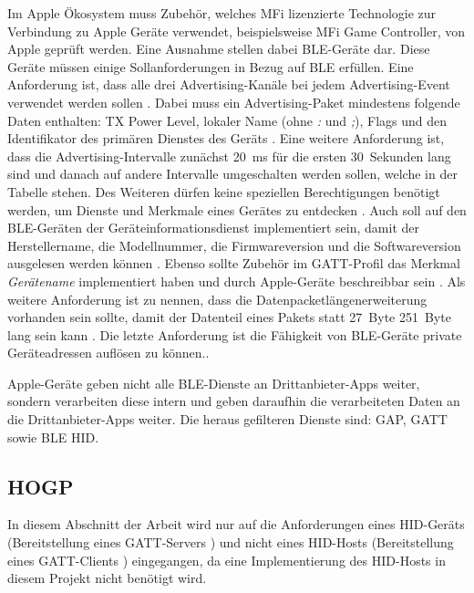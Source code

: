 Im Apple Ökosystem muss Zubehör, welches \ac{MFi} lizenzierte Technologie zur Verbindung zu Apple Geräte verwendet, beispielsweise \ac{MFi} Game Controller, von Apple geprüft werden. Eine Ausnahme stellen dabei \ac{BLE}-Geräte dar. \cite{appleMfiProgram} Diese Geräte müssen einige Sollanforderungen in Bezug auf \ac{BLE} erfüllen. Eine Anforderung ist, dass alle drei Advertising-Kanäle bei jedem Advertising-Event verwendet werden sollen \cite[S.~186]{appleDesignGuide}. Dabei muss ein Advertising-Paket mindestens folgende Daten enthalten: TX Power Level, lokaler Name (ohne \textit{:} und \textit{;}), Flags und den Identifikator des primären Dienstes des Geräts \cite[S.~186f.]{appleDesignGuide}. Eine weitere Anforderung ist, dass die Advertising-Intervalle zunächst 20~ms für die ersten 30~Sekunden lang sind und danach auf andere Intervalle umgeschalten werden sollen, welche in der Tabelle \cite[S.~187]{appleDesignGuide} stehen. Des Weiteren dürfen keine speziellen Berechtigungen benötigt werden, um Dienste und Merkmale eines Gerätes zu entdecken \cite[S.~190]{appleDesignGuide}. Auch soll auf den \ac{BLE}-Geräten der Geräteinformationsdienst implementiert sein, damit der Herstellername, die Modellnummer, die Firmwareversion und die Softwareversion ausgelesen werden können \cite[S.~191]{appleDesignGuide}. Ebenso sollte Zubehör im \ac{GATT}-Profil das Merkmal \textit{Gerätename} implementiert haben und durch Apple-Geräte beschreibbar sein \cite[S.~190]{appleDesignGuide}. Als weitere Anforderung ist zu nennen, dass die Datenpacketlängenerweiterung vorhanden sein sollte, damit der Datenteil eines Pakets statt 27~Byte 251~Byte lang sein kann \cite[S.~189]{appleDesignGuide}. Die letzte Anforderung ist die Fähigkeit von \ac{BLE}-Geräte private Geräteadressen auflösen zu können.\cite[S.~189]{appleDesignGuide}.

Apple-Geräte geben nicht alle \ac{BLE}-Dienste an Drittanbieter-Apps weiter, sondern verarbeiten diese intern und geben daraufhin die verarbeiteten Daten an die Drittanbieter-Apps weiter. Die heraus gefilteren Dienste sind: \ac{GAP}, \ac{GATT} sowie \ac{BLE} \ac{HID}. \cite[S.~192]{appleDesignGuide}

\subsection{\acf{HOGP}}
In diesem Abschnitt der Arbeit wird nur auf die Anforderungen eines \acs{HID}-Geräts (Bereitstellung eines \acs{GATT}-Servers \cite[S.~9]{bluetoothHOGP}) und nicht eines \acs{HID}-Hosts (Bereitstellung eines \acs{GATT}-Clients \cite[S.~9]{bluetoothHOGP}) eingegangen, da eine Implementierung des \acs{HID}-Hosts in diesem Projekt nicht benötigt wird.

